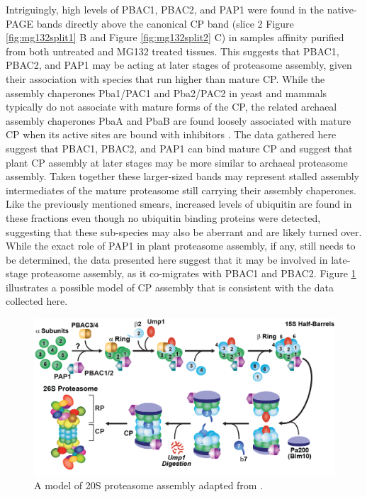 Intriguingly, high levels of PBAC1, PBAC2, and PAP1 were found in the native-PAGE bands directly above the canonical CP band (slice 2 Figure \ref{fig:mg132split1} B and Figure \ref{fig:mg132split2} C) in samples affinity purified from both untreated and MG132 treated tissues. This suggests that PBAC1, PBAC2, and PAP1 may be acting at later stages of proteasome assembly, given their association with species that run higher than mature CP. While the assembly chaperones Pba1/PAC1 and Pba2/PAC2 in yeast and mammals typically do not associate with mature forms of the CP, the related archaeal assembly chaperones PbaA and PbaB are found loosely associated with mature CP when its active sites are bound with inhibitors \citep{kusmierczyk11}. The data gathered here suggest that PBAC1, PBAC2, and PAP1 can bind mature CP and suggest that plant CP assembly at later stages may be more similar to archaeal proteasome assembly. Taken together these larger-sized bands may represent stalled assembly intermediates of the mature proteasome still carrying their assembly chaperones. Like the previously mentioned smears, increased levels of ubiquitin are found in these fractions even though no ubiquitin binding proteins were detected, suggesting that these sub-species may also be aberrant and are likely turned over. While the exact role of PAP1 in plant proteasome assembly, if any, still needs to be determined, the data presented here suggest that it may be involved in late-stage proteasome assembly, as it co-migrates with PBAC1 and PBAC2. Figure \ref{fig:cpassembly} illustrates a possible model of CP assembly that is consistent with the data collected here. 

\begin{figure}
	\centering
	\includegraphics[width=\columnwidth]{Proteasome/cpassemblymodel.png}
	{A model of 20S proteasome assembly adapted from \citep{murata09}.}
	\label{fig:cpassembly}
\end{figure}

